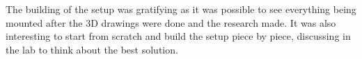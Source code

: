\documentclass[11pt,a4paper]{article}
\begin{document}
The building of the setup was gratifying as it was possible to see everything being mounted after the 3D drawings were done and the research made. It was also interesting to start from scratch and build the setup piece by piece, discussing in the lab to think about the best solution.

\newpage



\end{document}
